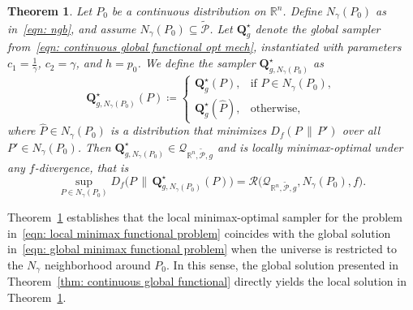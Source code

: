 \documentclass[accepted]{article}
\theoremstyle{plain} %
\newtheorem{theorem}{Theorem}[section]
\theoremstyle{definition}
\theoremstyle{remark}
\newcommand{\bQ}{\mathbf{Q}}
\begin{document}

\begin{theorem}\label{thm: local functional}
Let \( P_0 \) be a continuous distribution on \( \mathbb{R}^n \). Define \( N_\gamma(P_0) \)  as in~\eqref{eqn: ngb}, and assume \( N_\gamma(P_0) \subseteq \tilde{\mathcal{P}} \).
Let \( \bQ^\star_g \) denote the global sampler from~\eqref{eqn: continuous global functional opt mech}, instantiated with parameters \( c_1 = \frac{1}{\gamma} \), \( c_2 = \gamma \), and \( h = p_0 \).
We define the sampler \( \bQ^\star_{g, N_\gamma(P_0)} \) as
\[
\bQ^\star_{g, N_\gamma(P_0)}(P) \coloneqq
\begin{cases}
\bQ^\star_g(P), & \text{if } P \in N_\gamma(P_0), \\[1pt]
\bQ^\star_g(\hat{P}), & \text{otherwise},
\end{cases}
\]
where \( \hat{P} \in N_\gamma(P_0) \) is a distribution that minimizes \(  D_f(P \,\|\, P') \) over all $P' \in N_\gamma(P_0)$.
Then \( \bQ^\star_{g, N_\gamma(P_0)} \in \mathcal{Q}_{\mathbb{R}^n, \tilde{\mathcal{P}}, g} \) and is locally minimax-optimal under any \( f \)-divergence, that is
\[
\sup_{P \in N_\gamma(P_0)} D_f\big(P \,\|\, \bQ^\star_{g, N_\gamma(P_0)}(P)\big)
= \mathcal{R}\big(\mathcal{Q}_{\mathbb{R}^n, \tilde{\mathcal{P}}, g}, N_\gamma(P_0), f\big).
\]
\end{theorem}
Theorem~\ref{thm: local functional} establishes that the local minimax-optimal sampler for the problem in~\eqref{eqn: local minimax functional problem} coincides with the global solution in~\eqref{eqn: global minimax functional problem} when the universe is restricted to the $N_\gamma$ neighborhood around \( P_0 \). In this sense, the global solution presented in Theorem~\ref{thm: continuous global functional} directly yields the local solution in Theorem~\ref{thm: local functional}. 
\end{document}
